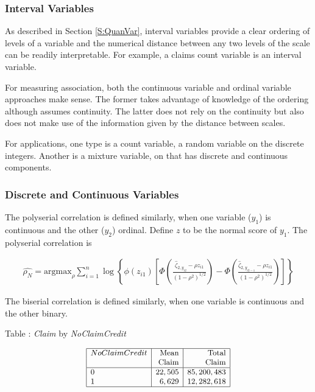 \documentclass[]{book}
\theoremstyle{definition}
\theoremstyle{definition}
\theoremstyle{definition}
\theoremstyle{remark}
\begin{document}
\subsubsection{Interval Variables}\label{interval-variables}

As described in Section \ref{S:QuanVar}, interval variables provide a
clear ordering of levels of a variable and the numerical distance
between any two levels of the scale can be readily interpretable. For
example, a claims count variable is an interval variable.

For measuring association, both the continuous variable and ordinal
variable approaches make sense. The former takes advantage of knowledge
of the ordering although assumes continuity. The latter does not rely on
the continuity but also does not make use of the information given by
the distance between scales.

For applications, one type is a count variable, a random variable on the
discrete integers. Another is a mixture variable, on that has discrete
and continuous components.

\subsubsection{Discrete and Continuous
Variables}\label{discrete-and-continuous-variables}

The polyserial correlation is defined similarly, when one variable
(\(y_1\)) is continuous and the other (\(y_2\)) ordinal. Define \(z\) to
be the normal score of \(y_1\). The polyserial correlation is

\begin{eqnarray*}
\hat{\rho_N} = \text{argmax}_{\rho}
\sum_{i=1}^n \log\left\{ \phi(z_{i1})\left[
\Phi(\frac{\hat{\zeta}_{2,y_{i2}} - \rho z_{i1}}
{(1-\rho^2)^{1/2}})
-\Phi(\frac{\hat{\zeta}_{2,y_{i2-1}} - \rho z_{i1}}
{(1-\rho^2)^{1/2}})
\right]
\right\}
\end{eqnarray*}

The biserial correlation is defined similarly, when one variable is
continuous and the other binary.

Table : \label{tab:ClByNoCl} \emph{Claim} by \emph{NoClaimCredit}

\[
{\small \begin{matrix}
\begin{array}{|l|r|r|} 
    \hline
NoClaimCredit & \text{Mean}     &\text{Total}       \\
 & \text{Claim}     &\text{Claim}       \\
  \hline
          0  & 22,505  &  85,200,483   \\
          1  &    6,629 &  12,282,618 \\
   \hline
\end{array}
\end{matrix}}
\]
\end{document}
